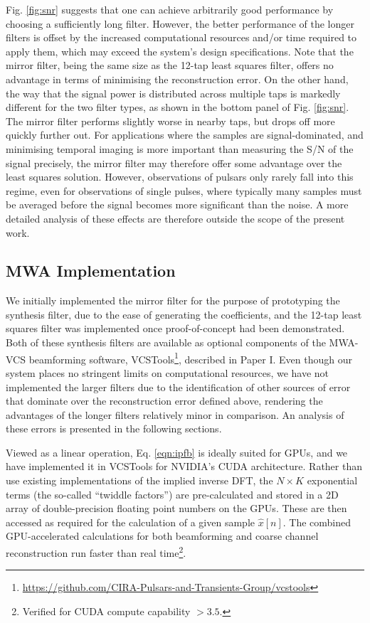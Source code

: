 \documentclass{pasa}%
\newcommand{\PaperI}{Paper I\nocite{Ord2019}}
\newcommand{\vcstools}{VCSTools}
\begin{document}
Fig. \ref{fig:snr} suggests that one can achieve arbitrarily good performance by choosing a sufficiently long filter.
However, the better performance of the longer filters is offset by the increased computational resources and/or time required to apply them, which may exceed the system's design specifications.
Note that the mirror filter, being the same size as the 12-tap least squares filter, offers no advantage in terms of minimising the reconstruction error.
On the other hand, the way that the signal power is distributed across multiple taps is markedly different for the two filter types, as shown in the bottom panel of Fig. \ref{fig:snr}.
The mirror filter performs slightly worse in nearby taps, but drops off more quickly further out.
For applications where the samples are signal-dominated, and minimising temporal imaging is more important than measuring the S/N of the signal precisely, the mirror filter may therefore offer some advantage over the least squares solution.
However, observations of pulsars only rarely fall into this regime, even for observations of single pulses, where typically many samples must be averaged before the signal becomes more significant than the noise.
A more detailed analysis of these effects are therefore outside the scope of the present work.

\subsection{MWA Implementation}

We initially implemented the mirror filter for the purpose of prototyping the synthesis filter, due to the ease of generating the coefficients, and the 12-tap least squares filter was implemented once proof-of-concept had been demonstrated.
Both of these synthesis filters are available as optional components of the MWA-VCS beamforming software, \vcstools{}\footnote{\url{https://github.com/CIRA-Pulsars-and-Transients-Group/vcstools}}, described in \PaperI{}.
Even though our system places no stringent limits on computational resources, we have not implemented the larger filters due to the identification of other sources of error that dominate over the reconstruction error defined above, rendering the advantages of the longer filters relatively minor in comparison.
An analysis of these errors is presented in the following sections.

Viewed as a linear operation, Eq. \eqref{eqn:ipfb} is ideally suited for GPUs, and we have implemented it in \vcstools{} for NVIDIA's CUDA architecture.
Rather than use existing implementations of the implied inverse DFT, the $N \times K$ exponential terms (the so-called ``twiddle factors'') are pre-calculated and stored in a 2D array of double-precision floating point numbers on the GPUs.
These are then accessed as required for the calculation of a given sample $\hat{x}[n]$.
The combined GPU-accelerated calculations for both beamforming and coarse channel reconstruction run faster than real time\footnote{Verified for CUDA compute capability $>3.5$.}.
\end{document}
